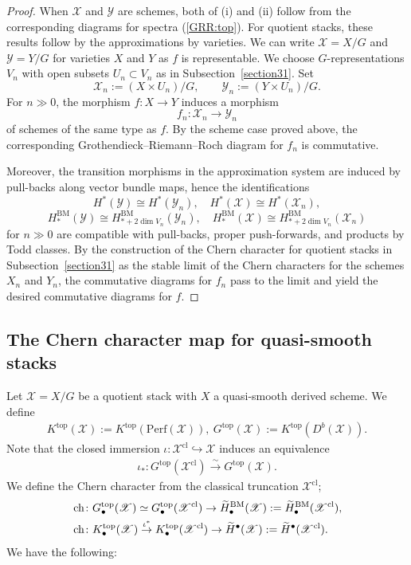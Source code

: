\documentclass [11pt,oneside,a4paper,mathscr]{amsart}
\theoremstyle{definition}
\newcommand{\X}{\mathscr{X}}
\newcommand{\ch}{\operatorname{ch}}
\begin{document}
\begin{proof}
When $\X$ and $\mathscr{Y}$ are schemes, both of (i) and (ii) follow from the corresponding diagrams for spectra (\ref{GRR:top}). 
For quotient stacks, these results follow by the approximations
by varieties. 
We can write $\X=X/G$ and $\mathscr{Y}=Y/G$ for varieties $X$ and $Y$ as $f$ is representable. 
We choose
$G$-representations $V_n$ with open subsets $U_n \subset V_n$ as in
Subsection~\ref{section31}. Set
\[
\X_n:=(X\times U_n)/G, \qquad \mathscr{Y}_n:=(Y\times U_n)/G.
\]
For $n \gg 0$, the morphism $f\colon X \to Y$ induces a morphism
\[
f_n \colon \X_n \to \mathscr{Y}_n
\]
of schemes of the same type as $f$. By the scheme case proved above, the corresponding Grothendieck--Riemann--Roch
diagram for $f_n$ is commutative.

Moreover, the transition morphisms in the approximation system are induced by pull-backs
along vector bundle maps, hence the identifications
\[
H^\ast(\mathscr{Y})\cong H^\ast(\mathscr{Y}_n), \quad H^\ast(\X)\cong H^\ast(\X_n),
\]
\[
H^{\mathrm{BM}}_\ast(\mathscr{Y})\cong H^{\mathrm{BM}}_{\ast+2\dim V_n}(\mathscr{Y}_n), \quad
H^{\mathrm{BM}}_\ast(\X)\cong H^{\mathrm{BM}}_{\ast+2\dim V_n}(\X_n)
\]
for $n \gg 0$ are compatible with pull-backs, proper push-forwards, and products by
Todd classes. By the construction of the Chern character for quotient stacks in Subsection~\ref{section31}
as the stable limit of the Chern characters for the schemes $X_n$ and $Y_n$, the commutative
diagrams for $f_n$ pass to the limit and yield the desired commutative diagrams for $f$.


\end{proof}



\subsection{The Chern character map for quasi-smooth stacks}\label{subsec331}

Let $\X=X/G$ be a quotient stack with $X$ a quasi-smooth derived 
scheme. 
We define 
\begin{align*}
K^{\mathrm{top}}(\X):=K^{\mathrm{top}}(\mathrm{Perf}(\X)), \ 
    G^{\mathrm{top}}(\X):=K^{\mathrm{top}}(D^b(\X)). 
\end{align*}
Note that the closed immersion $\iota \colon \X^{\mathrm{cl}} \hookrightarrow \X$ induces an equivalence 
\begin{align*}
\iota_{*} \colon G^{\mathrm{top}}(\X^{\mathrm{cl}}) 
\stackrel{\sim}{\to} G^{\mathrm{top}}(\X).
\end{align*}
We define the Chern character from the classical truncation $\X^{\mathrm{cl}}$;
\begin{align}\label{chquasismooth}
&\ch \colon G_{\bullet}^{\mathrm{top}}(\X) \simeq G_{\bullet}^{\mathrm{top}}(\X^{\mathrm{cl}})\to \widetilde{H}_{\bullet}^{\mathrm{BM}}(\X):=\widetilde{H}_{\bullet}^{\mathrm{BM}}(\X^{\mathrm{cl}}), \\
&\notag \ch \colon K_{\bullet}^{\mathrm{top}}(\X) \stackrel{\iota^*}{\to} K_{\bullet}^{\mathrm{top}}(\X^{\mathrm{cl}})\to \widetilde{H}^{\bullet}(\X):=\widetilde{H}^{\bullet}(\X^{\mathrm{cl}}).
\end{align}
We have the following: 
\end{document}

